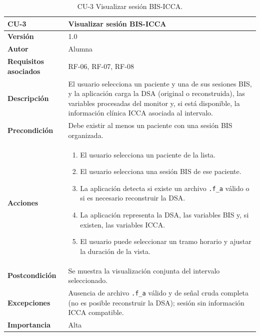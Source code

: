 \documentclass[
  spanish,
  a4paper,
  12pt,
  twoside]{memoir}
\providecommand{\tightlist}{%
  \setlength{\itemsep}{0pt}\setlength{\parskip}{0pt}}
\begin{document}
\begin{table}[p]
    \centering
    \begin{tabularx}{\linewidth}{ p{} p{} }
        \toprule
        \textbf{CU-3}    & \textbf{Visualizar sesión BIS-ICCA}\\
        \toprule
        \textbf{Versión}              & 1.0    \\
        \textbf{Autor}                & Alumna \\
        \textbf{Requisitos asociados} & RF-06, RF-07, RF-08 \\
        \textbf{Descripción}          & El usuario selecciona un paciente y una de sus sesiones BIS, y la aplicación carga la DSA (original o reconstruida), las variables procesadas del monitor y, si está disponible, la información clínica ICCA asociada al intervalo. \\
        \textbf{Precondición}         & Debe existir al menos un paciente con una sesión BIS organizada. \\
        \textbf{Acciones}             &
        \begin{enumerate}
            \def\labelenumi{\arabic{enumi}.}
            \tightlist
            \item El usuario selecciona un paciente de la lista.
            \item El usuario selecciona una sesión BIS de ese paciente.
            \item La aplicación detecta si existe un archivo \texttt{.f\_a} válido o si es necesario reconstruir la DSA.
            \item La aplicación representa la DSA, las variables BIS y, si existen, las variables ICCA.
            \item El usuario puede seleccionar un tramo horario y ajustar la duración de la vista.
        \end{enumerate}\\
        \textbf{Postcondición}        & Se muestra la visualización conjunta del intervalo seleccionado. \\
        \textbf{Excepciones}          & Ausencia de archivo \texttt{.f\_a} válido y de señal cruda completa (no es posible reconstruir la DSA); sesión sin información ICCA compatible. \\
        \textbf{Importancia}          & Alta \\
        \bottomrule
    \end{tabularx}
    \caption{CU-3 Visualizar sesión BIS-ICCA.}
\end{table}
\end{document}
